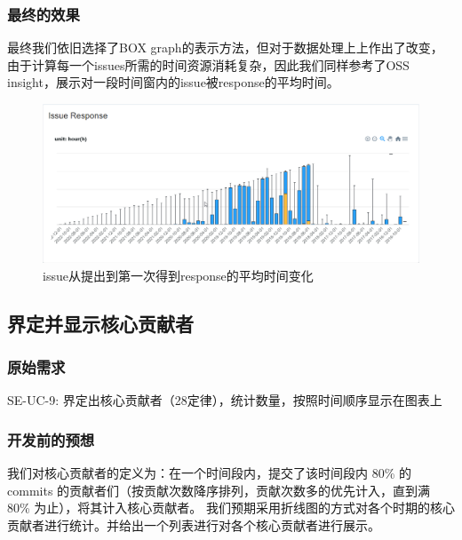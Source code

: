 \documentclass[a4paper,20pt]{article}
\begin{document}
\subsubsection{最终的效果}
最终我们依旧选择了BOX graph的表示方法，但对于数据处理上上作出了改变，由于计算每一个issues所需的时间资源消耗复杂，因此我们同样参考了OSS insight，展示对一段时间窗内的issue被response的平均时间。
\begin{figure}[h]
\centering
\includegraphics[scale=0.4]{pics/IsuueResponse.png}
\caption{issue从提出到第⼀次得到response的平均时间变化}
\label{fig:1}
\end{figure}


\subsection{界定并显示核心贡献者}
\subsubsection{原始需求}
SE-UC-9: 界定出核⼼贡献者（28定律），统计数量，按照时间顺序显示在图表上\par
\subsubsection{开发前的预想}
我们对核心贡献者的定义为：在一个时间段内，提交了该时间段内 80\% 的 commits 的贡献者们（按贡献次数降序排列，贡献次数多的优先计入，直到满 80\% 为止），将其计入核心贡献者。
我们预期采用折线图的方式对各个时期的核心贡献者进行统计。并给出一个列表进行对各个核心贡献者进行展示。
\end{document}
